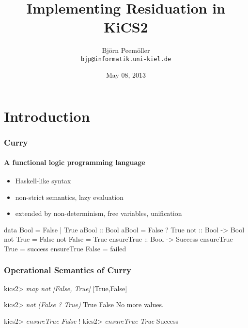 \documentclass[
,hyperref={pdfpagelabels=false}
,xcolor=dvipsnames
]{beamer}
\title{Implementing Residuation in KiCS2}
\date{May 08, 2013}
\author[Björn Peemöller]{\texorpdfstring
{Björn Peemöller\\\texttt{bjp@informatik.uni-kiel.de}}
{Björn Peemöller}
}
\institute{Kiel University}
\begin{document}
\begin{frame}
\titlepage
\end{frame}


\section{Introduction}

\begin{frame}[fragile]%
\frametitle{Curry}
\framesubtitle{A functional logic programming language}

\begin{itemize}
\item Haskell-like syntax
\item non-strict semantics, lazy evaluation
\item extended by non-determinism, free variables, unification
\end{itemize}

\begin{curry}
data Bool = False | True \medskip
aBool :: Bool
aBool = False ? True \medskip
not :: Bool -> Bool
not True  = False
not False = True \medskip
ensureTrue :: Bool -> Success
ensureTrue True  = success
ensureTrue False = failed
\end{curry}
\end{frame}

\begin{frame}[fragile]%
\frametitle{Operational Semantics of Curry}

\begin{kics2}
kics2> \textsl{map not [False, True]}
[True,False]
\end{kics2}
\pause
\begin{kics2}
kics2> \textsl{not (False ? True)}
True
False
No more values.
\end{kics2}
\pause
\begin{kics2}
kics2> \textsl{ensureTrue False}
!
kics2> \textsl{ensureTrue True}
Success
\end{kics2}
\end{frame}
\end{document}
